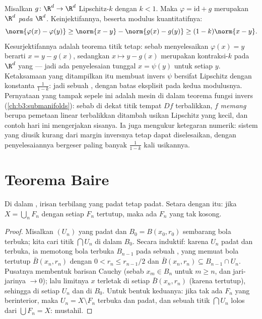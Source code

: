 \begin{example}
\label{ex:b3:complete:perturbident}
Misalkan $g \colon \R^d \to \R^d$ Lipschitz-$k$ dengan $k < 1$.
Maka $\varphi = \mathrm{id} + g$ merupakan \emph{
$\R^d$ pada $\R^d$}. Keinjektifannya, beserta modulus
kuantitatifnya:
\[
\norm{\varphi(x) - \varphi(y)} \geq \norm{x - y} -
\norm{g(x) - g(y)} \geq (1 - k)\norm{x - y} .
\]
Kesurjektifannya adalah teorema titik tetap: sebab menyelesaikan
$\varphi(x) = y$ berarti $x = y - g(x)$, sedangkan $x \mapsto y -
g(x)$ merupakan kontraksi-$k$ pada $\R^d$ yang  --- jadi ada
penyelesaian tunggal $x = \psi(y)$ untuk setiap $y$.
Ketaksamaan yang ditampilkan itu membuat invers $\psi$ bersifat Lipschitz dengan
konstanta $\frac1{1-k}$: jadi sebuah , dengan batas
eksplisit pada kedua modulusnya. Pernyataan yang tampak sepele ini adalah
mesin di dalam teorema fungsi invers
(\cref{ch:b3:submanifolds}): sebab di dekat titik tempat $Df$
terbalikkan, $f$ \emph{memang} berupa pemetaan linear terbalikkan ditambah
usikan Lipschitz yang kecil, dan contoh hari ini mengerjakan
sisanya. Ia juga mengukur ketegaran numerik: sistem
yang diusik kurang dari margin inversnya tetap dapat
diselesaikan, dengan penyelesaiannya bergeser paling banyak
$\frac{1}{1-k}$ kali usikannya.
\end{example}

\section{Teorema Baire}

\begin{theorem}[Baire]\label{thm:b3:complete:baire}
Di dalam , irisan terbilang  yang
padat tetap padat. Setara dengan itu: jika $X = \bigcup_{n}F_n$ dengan
setiap $F_n$ tertutup, maka ada $F_n$ yang  tak
kosong.
\end{theorem}

\begin{proof}
Misalkan $(U_n)$  yang padat dan $B_0 = B(x_0, r_0)$ sembarang bola
terbuka; kita cari titik $\bigcap U_n$ di dalam $B_0$. Secara induktif:
karena $U_{n}$ padat dan terbuka, ia memotong bola terbuka $B_{n-1}$
pada sebuah , yang memuat bola tertutup $\bar B(x_n, r_n)$
dengan $0 < r_n \leq r_{n-1}/2$ dan $\bar B(x_n, r_n) \subseteq
B_{n-1}\cap U_n$. Pusatnya membentuk barisan Cauchy (sebab $x_m \in
B_n$ untuk $m \geq n$, dan jari-jarinya $\to 0$); lalu limitnya $x$ terletak di
setiap $\bar B(x_n, r_n)$ (karena tertutup), sehingga di setiap $U_n$ dan
di $B_0$. Untuk bentuk keduanya: jika tak ada $F_n$ yang berinterior, maka
$U_n = X \setminus F_n$ terbuka dan padat, dan sebuah titik
$\bigcap U_n$ lolos dari $\bigcup F_n = X$: mustahil.
\end{proof}

